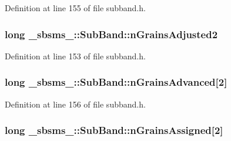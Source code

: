 Definition at line 155 of file subband.\+h.

\subsubsection[{\texorpdfstring{n\+Grains\+Adjusted2}{nGrainsAdjusted2}}]{\setlength{\rightskip}{0pt plus 5cm}long \+\_\+sbsms\+\_\+\+::\+Sub\+Band\+::n\+Grains\+Adjusted2\hspace{0.3cm}{\ttfamily [protected]}}\hypertarget{class__sbsms___1_1_sub_band_a0429bd9695c1655fe379ef92128cd14f}{}\label{class__sbsms___1_1_sub_band_a0429bd9695c1655fe379ef92128cd14f}


Definition at line 153 of file subband.\+h.

\subsubsection[{\texorpdfstring{n\+Grains\+Advanced}{nGrainsAdvanced}}]{\setlength{\rightskip}{0pt plus 5cm}long \+\_\+sbsms\+\_\+\+::\+Sub\+Band\+::n\+Grains\+Advanced\mbox{[}2\mbox{]}\hspace{0.3cm}{\ttfamily [protected]}}\hypertarget{class__sbsms___1_1_sub_band_a2f2984bbc21730547cc3e332bf9feac9}{}\label{class__sbsms___1_1_sub_band_a2f2984bbc21730547cc3e332bf9feac9}


Definition at line 156 of file subband.\+h.

\subsubsection[{\texorpdfstring{n\+Grains\+Assigned}{nGrainsAssigned}}]{\setlength{\rightskip}{0pt plus 5cm}long \+\_\+sbsms\+\_\+\+::\+Sub\+Band\+::n\+Grains\+Assigned\mbox{[}2\mbox{]}\hspace{0.3cm}{\ttfamily [protected]}}\hypertarget{class__sbsms___1_1_sub_band_a7aba12c3bc29ae31f2b2fb963c363d2b}{}\label{class__sbsms___1_1_sub_band_a7aba12c3bc29ae31f2b2fb963c363d2b}


